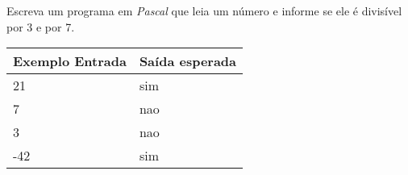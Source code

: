 \item Escreva um programa em \emph{Pascal} que leia um número e informe se ele 
é divisível por 3 e por 7.

\begin{center}
\begin{tabular}{|l|l|} \hline
Exemplo Entrada & Saída esperada \\ \hline
21               & sim               \\ \hline
7                & nao               \\ \hline
3                & nao               \\ \hline
-42              & sim               \\ \hline
\end{tabular}
\end{center}
